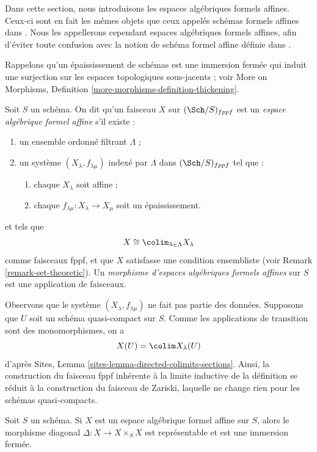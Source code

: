 \noindent
Dans cette section, nous introduisons les espaces algébriques formels affines.
Ceux-ci sont en fait les mêmes objets que ceux appelés schémas
formels affines dans \cite{BVGD}. Nous les appellerons cependant
espaces algébriques formels affines, afin d'éviter toute confusion avec
la notion de schéma formel affine définie dans \cite{EGA}.

\medskip\noindent
Rappelons qu'un épaississement de schémas est une immersion
fermée qui induit une surjection sur les espaces topologiques
sous-jacents ; voir More on Morphisms, Definition
\ref{more-morphisms-definition-thickening}.

\begin{definition}
\label{definition-affine-formal-algebraic-space}
Soit $S$ un schéma. On dit qu'un faisceau $X$ sur $(\Sch/S)_{fppf}$ est un
{\it espace algébrique formel affine} s'il existe :
\begin{enumerate}
\item un ensemble ordonné filtrant $\Lambda$ ;
\item un système $(X_\lambda, f_{\lambda \mu})$ indexé par $\Lambda$
dans $(\Sch/S)_{fppf}$ tel que :
\begin{enumerate}
\item chaque $X_\lambda$ soit affine ;
\item chaque $f_{\lambda \mu} : X_\lambda \to X_\mu$ soit un épaississement.
\end{enumerate}
\end{enumerate}
et tels que
$$
X \cong \colim_{\lambda \in \Lambda} X_\lambda
$$
comme faisceaux fppf, et que $X$ satisfasse une condition ensembliste
(voir Remark \ref{remark-set-theoretic}). Un
{\it morphisme d'espaces algébriques formels affines}
sur $S$ est une application de faisceaux.
\end{definition}

\noindent
Observons que le système $(X_\lambda, f_{\lambda \mu})$ ne fait pas
partie des données. Supposons que $U$ soit un schéma quasi-compact sur $S$.
Comme les applications de transition sont des monomorphismes, on a
$$
X(U) = \colim X_\lambda(U)
$$
d'après Sites, Lemma \ref{sites-lemma-directed-colimits-sections}.
Ainsi, la construction du faisceau fppf inhérente à la limite inductive de la
définition se réduit à la construction du faisceau de Zariski, laquelle ne change
rien pour les schémas quasi-compacts.

\begin{lemma}
\label{lemma-diagonal-affine-formal-algebraic-space}
Soit $S$ un schéma. Si $X$ est un espace algébrique formel affine sur
$S$, alors le morphisme diagonal $\Delta : X \to X \times_S X$
est représentable et est une immersion fermée.
\end{lemma}


